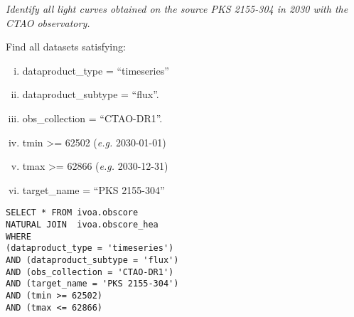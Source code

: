 {\em Identify all light curves obtained on the source PKS 2155-304 in 2030 with the CTAO observatory.\/}

\medskip
\noindent Find all datasets satisfying:
\begin{enumerate}[(i)]
  \item dataproduct\_type = ``timeseries''
  \item dataproduct\_subtype = ``flux''.
  \item obs\_collection = ``CTAO-DR1''.
  \item tmin >= 62502 ({\em e.g.\/} 2030-01-01)
  \item tmax >= 62866 ({\em e.g.\/} 2030-12-31)
  \item target\_name = ``PKS 2155-304''
\end{enumerate}

\begin{verbatim}
SELECT * FROM ivoa.obscore
NATURAL JOIN  ivoa.obscore_hea
WHERE
(dataproduct_type = 'timeseries')
AND (dataproduct_subtype = 'flux')
AND (obs_collection = 'CTAO-DR1')
AND (target_name = 'PKS 2155-304')
AND (tmin >= 62502)
AND (tmax <= 62866)
\end{verbatim}

